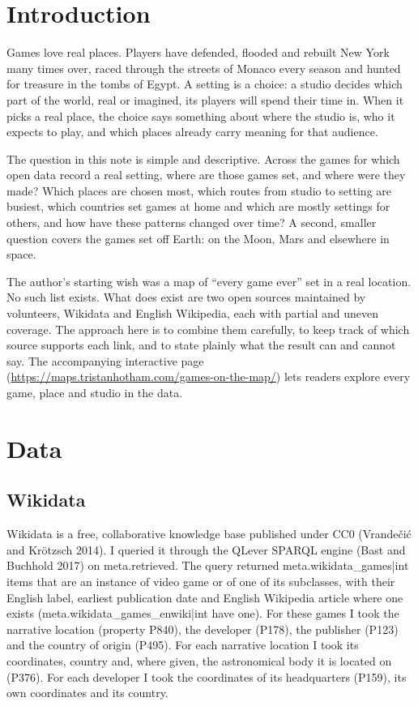 \documentclass[11pt,a4paper]{article}
\begin{document}
\section{Introduction}

Games love real places. Players have defended, flooded and rebuilt New York many times over, raced through the streets of Monaco every season and hunted for treasure in the tombs of Egypt. A setting is a choice: a studio decides which part of the world, real or imagined, its players will spend their time in. When it picks a real place, the choice says something about where the studio is, who it expects to play, and which places already carry meaning for that audience.

The question in this note is simple and descriptive. Across the games for which open data record a real setting, where are those games set, and where were they made? Which places are chosen most, which routes from studio to setting are busiest, which countries set games at home and which are mostly settings for others, and how have these patterns changed over time? A second, smaller question covers the games set off Earth: on the Moon, Mars and elsewhere in space.

The author's starting wish was a map of ``every game ever'' set in a real location. No such list exists. What does exist are two open sources maintained by volunteers, Wikidata and English Wikipedia, each with partial and uneven coverage. The approach here is to combine them carefully, to keep track of which source supports each link, and to state plainly what the result can and cannot say. The accompanying interactive page (\url{https://maps.tristanhotham.com/games-on-the-map/}) lets readers explore every game, place and studio in the data.

\section{Data}

\subsection{Wikidata}

Wikidata is a free, collaborative knowledge base published under CC0 (Vrandečić and Krötzsch 2014). I queried it through the QLever SPARQL engine (Bast and Buchhold 2017) on {{meta.retrieved}}. The query returned {{meta.wikidata_games|int}} items that are an instance of video game or of one of its subclasses, with their English label, earliest publication date and English Wikipedia article where one exists ({{meta.wikidata_games_enwiki|int}} have one). For these games I took the narrative location (property P840), the developer (P178), the publisher (P123) and the country of origin (P495). For each narrative location I took its coordinates, country and, where given, the astronomical body it is located on (P376). For each developer I took the coordinates of its headquarters (P159), its own coordinates and its country.
\end{document}
